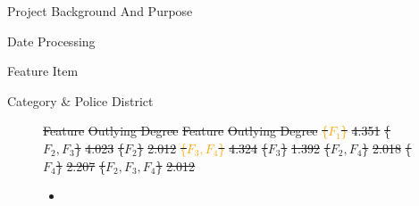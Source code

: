 \documentclass[
 size=14pt,
 paper=smartboard,  %
 mode=present, 		%
 display=slides, 	%
 style=tuliplab,  	%
 pauseslide,
 fleqn,leqno]{powerdot}
\providecommand{\DIFdeltex}[1]{{\protect\color{red}\sout{#1}}}                      %
\providecommand{\DIFdelFL}[1]{\DIFdel{#1}} %
\providecommand{\DIFdel}[1]{\texorpdfstring{\DIFdeltex{#1}}{}} %
\begin{document}
\begin{slide}
\begin{slide}{Project Background And Purpose}
\begin{slide}{Date Processing}
\begin{slide}{Feature Item}
\begin{slide}{Category \& Police District}
\begin{figure}[htbp]
  \DIFdelFL{Feature }%
\DIFdelFL{Outlying Degree }%
\DIFdelFL{Feature }%
\DIFdelFL{Outlying Degree }%
\DIFdelFL{\textcolor{orange}{\{$F_1$\}}  }%
\DIFdelFL{4.351  }%
\DIFdelFL{\{$F_2, F_3$\}  }%
\DIFdelFL{4.023 }%
\DIFdelFL{\{$F_2$\}  }%
\DIFdelFL{2.012                      }%
\DIFdelFL{\textcolor{orange}{\{$F_3, F_4$\}} }%
\DIFdelFL{4.324 }%
\DIFdelFL{\{$F_3$\}  }%
\DIFdelFL{1.392                      }%
\DIFdelFL{\{$F_2, F_4$\} }%
\DIFdelFL{2.018 }%
\DIFdelFL{\{$F_4$\}  }%
\DIFdelFL{2.207                      }%
\DIFdelFL{\{$F_2, F_3, F_4$\} }%
\DIFdelFL{2.012 }%


\begin{itemize}%
\item%


\end{itemize}
\end{figure}
\end{slide}
\end{slide}
\end{slide}
\end{slide}
\end{slide}
\end{document}
